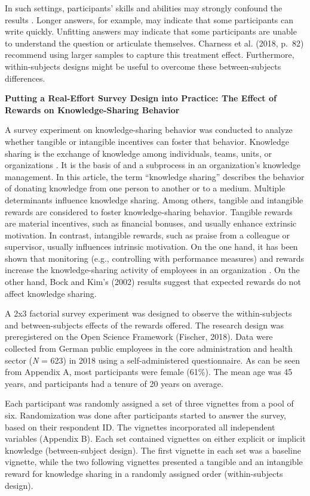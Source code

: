 \documentclass{article}
\begin{document}
In such settings, participants' skills and abilities may strongly confound the results \parencite[pp. 82][]{Charness2018}. Longer answers, for example, may indicate that some participants can write quickly. Unfitting answers may indicate that some participants are unable to understand the question or articulate themselves. Charness et al. (2018, p. 82) recommend using larger samples to capture this treatment effect. Furthermore, within-subjects designs might be useful to overcome these between-subjects differences.

\textbf{Putting a Real-Effort Survey Design into Practice: The Effect of Rewards on Knowledge-Sharing Behavior}

A survey experiment on knowledge-sharing behavior was conducted to analyze whether tangible or intangible incentives can foster that behavior. Knowledge sharing is the exchange of knowledge among individuals, teams, units, or organizations \parencite{Paulin2012}. It is the basis of and a subprocess in an organization's knowledge management. In this article, the term “knowledge sharing” describes the behavior of donating knowledge from one person to another or to a medium. Multiple determinants influence knowledge sharing. Among others, tangible and intangible rewards are considered to foster knowledge-sharing behavior. Tangible rewards are material incentives, such as financial bonuses, and usually enhance extrinsic motivation. In contrast, intangible rewards, such as praise from a colleague or supervisor, usually influences intrinsic motivation. On the one hand, it has been shown that monitoring (e.g., controlling with performance measures) and rewards increase the knowledge-sharing activity of employees in an organization \parencite{Wang2011, Witherspoon2013}. On the other hand, Bock and Kim's (2002) results suggest that expected rewards do not affect knowledge sharing.

A 2x3 factorial survey experiment was designed to observe the within-subjects and between-subjects effects of the rewards offered. The research design was preregistered on the Open Science Framework (Fischer, 2018). Data were collected from German public employees in the core administration and health sector (\emph{N} = 623) in 2018 using a self-administered questionnaire. As can be seen from Appendix A, most participants were female (61\%). The mean age was 45 years, and participants had a tenure of 20 years on average.

Each participant was randomly assigned a set of three vignettes from a pool of six. Randomization was done after participants started to answer the survey, based on their respondent ID. The vignettes incorporated all independent variables (Appendix B). Each set contained vignettes on either explicit or implicit knowledge (between-subject design). The first vignette in each set was a baseline vignette, while the two following vignettes presented a tangible and an intangible reward for knowledge sharing in a randomly assigned order (within-subjects design).
\end{document}
